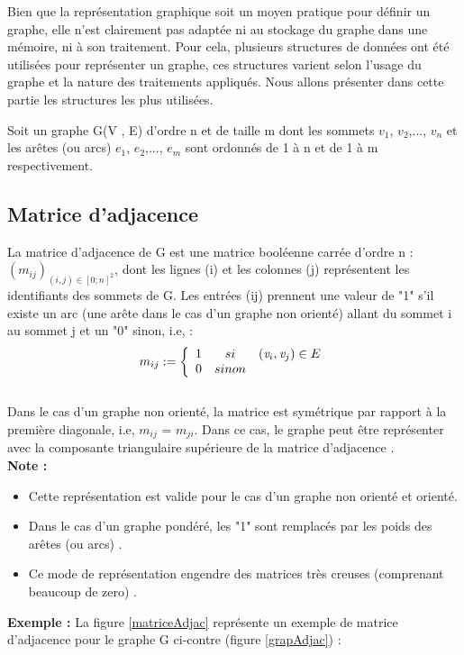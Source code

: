Bien que la représentation graphique soit un moyen pratique pour définir un graphe, elle n'est clairement pas adaptée ni au stockage du graphe dans une mémoire, ni à son traitement. Pour cela, plusieurs structures de données ont été utilisées pour représenter un graphe, ces structures varient selon l’usage du graphe et la nature des traitements appliqués. Nous allons présenter dans cette partie les structures les plus utilisées.

Soit un graphe G(V , E) d'ordre n et de taille m dont les sommets $\textit{v}_{1}$, $\textit{v}_{2}$,..., $\textit{v}_{n}$ et les arêtes (ou arcs) $\textit{e}_{1}$, $\textit{e}_{2}$,..., $\textit{e}_{m}$ sont ordonnés de 1 à n et de 1 à m respectivement.
		
		

		
			\subsection{Matrice d'adjacence}
			
				La matrice d’adjacence de G est une matrice booléenne 					carrée d’ordre n : ${({m}_{ij})}_{(i,j) \in {[0;n]}^{2}}$,  dont les 					lignes (i) et les colonnes (j)  représentent les identifiants des sommets de G. Les entrées (ij) prennent une valeur de "1" s’il existe un 				arc (une arête dans le cas d'un graphe non orienté) allant du 			sommet i au sommet j et un "0" sinon, i.e, \citep{lehman2010mathematics} \citep{mathieu} \citep{IUTLyonInformatique} :
			\[{m}_{ij} :=
			\left\{
			\begin{array}{r c l}
			1 & si & (\textit{v}_{i} , \textit{v}_{j}) \in E \\
			0 & sinon
			\end{array}
			\right.
			\]
			\\
			Dans le cas d’un graphe non orienté, la matrice est 						symétrique par rapport à la première diagonale, i.e, ${m}_{ij}$ = ${m}_{ji}$. Dans ce cas, le 						graphe peut être représenter avec  la composante 							triangulaire supérieure de la matrice d'adjacence \citep{muller}.\\
			\textbf{Note :} \begin{itemize} 
			\item Cette représentation est valide pour le cas 					d'un graphe non orienté et orienté.
			\item Dans le cas d'un graphe pondéré, les "1" sont remplacés par les poids des arêtes (ou arcs) \citep{lopez2003cours}.
			\item Ce mode de représentation engendre des matrices très creuses (comprenant beaucoup de zero) \citep{hennecart2012elements}. 
			\end{itemize}
			\textbf{Exemple :} La figure \ref{matriceAdjac} représente 					un exemple de matrice d'adjacence pour le graphe G ci-contre 			(figure \ref{grapAdjac}) :
			
